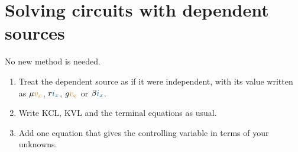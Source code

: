 \documentclass[11pt,a4paper]{article}
\newcommand{\Icol}[1]{\textcolor{ccur}{#1}}
\newcommand{\Vcol}[1]{\textcolor{cvolt}{#1}}
\begin{document}
\section{Solving circuits with dependent sources}

No new method is needed.

\begin{ideabox}[Recipe]
\begin{enumerate}[leftmargin=1.4em]
  \item Treat the dependent source as if it were independent, with its value written as
        $\mu\Vcol{v_x}$, $r\Icol{i_x}$, $g\Vcol{v_x}$ or $\beta\Icol{i_x}$.
  \item Write KCL, KVL and the terminal equations as usual.
  \item Add one equation that gives the controlling variable in terms of your unknowns.
\end{enumerate}
\end{ideabox}
\end{document}
